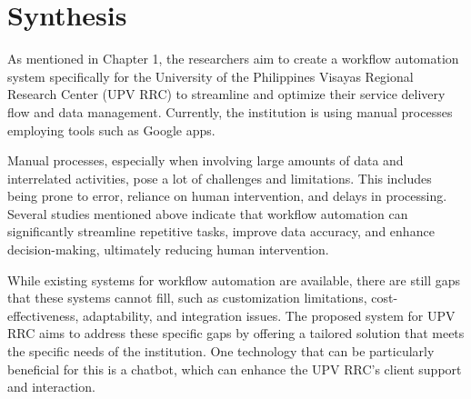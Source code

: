 \begin{table}
	
\end{table}

\section{Synthesis}

As mentioned in Chapter 1, the researchers aim to create a workflow automation system specifically for the University of the Philippines Visayas Regional Research Center (UPV RRC) to streamline and optimize their service delivery flow and data management. Currently, the institution is using manual processes employing tools such as Google apps.

Manual processes, especially when involving large amounts of data and interrelated activities, pose a lot of challenges and limitations. This includes being prone to error, reliance on human intervention, and delays in processing. Several studies mentioned above indicate that workflow automation can significantly streamline repetitive tasks, improve data accuracy, and enhance decision-making, ultimately reducing human intervention. 

While existing systems for workflow automation are available, there are still gaps that these systems cannot fill, such as customization limitations, cost-effectiveness, adaptability, and integration issues. The proposed system for UPV RRC aims to address these specific gaps by offering a tailored solution that meets the specific needs of the institution. One technology that can be particularly beneficial for this is a chatbot, which can enhance the UPV RRC’s client support and interaction. 













